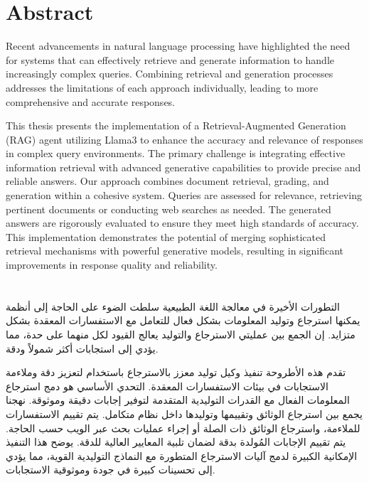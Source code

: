 \chapter*{Abstract}

Recent advancements in natural language processing have highlighted the need for systems that can effectively retrieve and generate information to handle increasingly complex queries. Combining retrieval and generation processes addresses the limitations of each approach individually, leading to more comprehensive and accurate responses.

\hfill

This thesis presents the implementation of a Retrieval-Augmented Generation (RAG) agent utilizing Llama3 to enhance the accuracy and relevance of responses in complex query environments. The primary challenge is integrating effective information retrieval with advanced generative capabilities to provide precise and reliable answers. Our approach combines document retrieval, grading, and generation within a cohesive system. Queries are assessed for relevance, retrieving pertinent documents or conducting web searches as needed. The generated answers are rigorously evaluated to ensure they meet high standards of accuracy. This implementation demonstrates the potential of merging sophisticated retrieval mechanisms with powerful generative models, resulting in significant improvements in response quality and reliability.

\clearpage

\chapter*{}

\begin{RLtext}
    التطورات الأخيرة في معالجة اللغة الطبيعية سلطت الضوء على الحاجة إلى أنظمة يمكنها استرجاع وتوليد المعلومات بشكل فعال للتعامل مع الاستفسارات المعقدة بشكل متزايد. إن الجمع بين عمليتي الاسترجاع والتوليد يعالج القيود لكل منهما على حدة، مما يؤدي إلى استجابات أكثر شمولاً ودقة.

    \hfill

    تقدم هذه الأطروحة تنفيذ وكيل توليد معزز بالاسترجاع  باستخدام  لتعزيز دقة وملاءمة الاستجابات في بيئات الاستفسارات المعقدة. التحدي الأساسي هو دمج استرجاع المعلومات الفعال مع القدرات التوليدية المتقدمة لتوفير إجابات دقيقة وموثوقة. نهجنا يجمع بين استرجاع الوثائق وتقييمها وتوليدها داخل نظام متكامل. يتم تقييم الاستفسارات للملاءمة، واسترجاع الوثائق ذات الصلة أو إجراء عمليات بحث عبر الويب حسب الحاجة. يتم تقييم الإجابات المُولدة بدقة لضمان تلبية المعايير العالية للدقة. يوضح هذا التنفيذ الإمكانية الكبيرة لدمج آليات الاسترجاع المتطورة مع النماذج التوليدية القوية، مما يؤدي إلى تحسينات كبيرة في جودة وموثوقية الاستجابات.
\end{RLtext}

